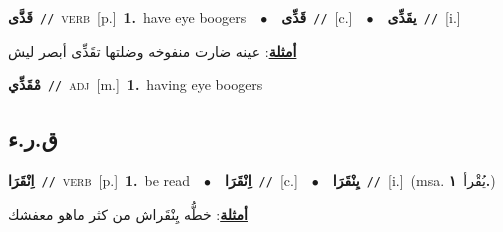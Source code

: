 \documentclass[10pt,a4paper,twoside]{article} %
\begin{document}
\begin{multicols}{2}
{\setlength\topsep{0pt}\textbf{\foreignlanguage{arabic}{قَذَّى}}\ {\color{gray}\texttt{//}\color{black}}\ \textsc{verb}\ [p.]\ \textbf{1.}~have eye boogers\ \ $\bullet$\ \ \setlength\topsep{0pt}\textbf{\foreignlanguage{arabic}{قَذِّى}}\ {\color{gray}\texttt{//}\color{black}}\ [c.]\ \ $\bullet$\ \ \setlength\topsep{0pt}\textbf{\foreignlanguage{arabic}{يقَذِّى}}\ {\color{gray}\texttt{//}\color{black}}\ [i.]\  \begin{flushright}\color{gray}\foreignlanguage{arabic}{\textbf{\underline{\foreignlanguage{arabic}{أمثلة}}}: عينه ضارت منفوخه وضلتها تقَذِّى أبصر ليش}\end{flushright}\color{black}} \vspace{2mm}

{\setlength\topsep{0pt}\textbf{\foreignlanguage{arabic}{مْقَذِّي}}\ {\color{gray}\texttt{//}\color{black}}\ \textsc{adj}\ [m.]\ \textbf{1.}~having eye boogers\ } \vspace{2mm}

\vspace{-3mm}
\subsection*{\color{blue}\foreignlanguage{arabic}{ق.ر.ء}\color{blue}{}} 

{\setlength\topsep{0pt}\textbf{\foreignlanguage{arabic}{اِنْقَرَا}}\ {\color{gray}\texttt{//}\color{black}}\ \textsc{verb}\ [p.]\ \textbf{1.}~be read\ \ $\bullet$\ \ \setlength\topsep{0pt}\textbf{\foreignlanguage{arabic}{اِنْقَرَا}}\ {\color{gray}\texttt{//}\color{black}}\ [c.]\ \ $\bullet$\ \ \setlength\topsep{0pt}\textbf{\foreignlanguage{arabic}{يِنْقَرَا}}\ {\color{gray}\texttt{//}\color{black}}\ [i.]\ \color{gray}(msa. \foreignlanguage{arabic}{يُقْرأ}~\foreignlanguage{arabic}{\textbf{١.}})\color{black}\  \begin{flushright}\color{gray}\foreignlanguage{arabic}{\textbf{\underline{\foreignlanguage{arabic}{أمثلة}}}: خطُّه يِنْقَراش من كثر ماهو معفشك}\end{flushright}\color{black}} \vspace{2mm}


\end{multicols}
\end{document}
